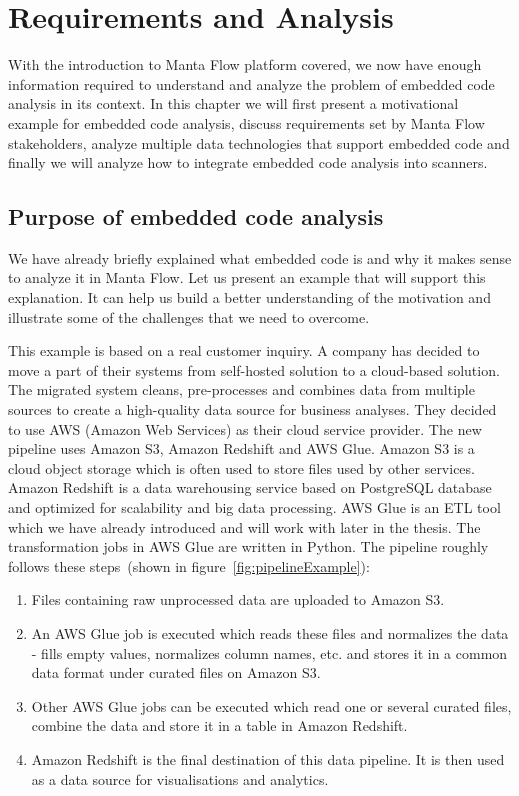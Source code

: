  \chapter{Requirements and Analysis}

With the introduction to Manta Flow platform covered, we now have enough information required to understand and analyze the problem of embedded code analysis in its context. In this chapter we will first present a motivational example for embedded code analysis, discuss requirements set by Manta Flow stakeholders, analyze multiple data technologies that support embedded code and finally we will analyze how to integrate embedded code analysis into scanners.

\section{Purpose of embedded code analysis}

We have already briefly explained what embedded code is and why it makes sense to analyze it in Manta Flow. Let us present an example that will support this explanation. It can help us build a better understanding of the motivation and illustrate some of the challenges that we need to overcome.
\par
This example is based on a real customer inquiry. A company has decided to move a part of their systems from self-hosted solution to a cloud-based solution. The migrated system cleans, pre-processes and combines data from multiple sources to create a high-quality data source for business analyses. They decided to use AWS (Amazon Web Services) as their cloud service provider. The new pipeline uses Amazon S3, Amazon Redshift and AWS Glue. Amazon S3 is a cloud object storage which is often used to store files used by other services. Amazon Redshift is a data warehousing service based on PostgreSQL database and optimized for scalability and big data processing. AWS Glue is an ETL tool which we have already introduced and will work with later in the thesis. The transformation jobs in AWS Glue are written in Python. The pipeline roughly follows these steps~(shown in figure~\ref{fig:pipelineExample}):
\begin{enumerate}
    \item Files containing raw unprocessed data are uploaded to Amazon S3.
    \item An AWS Glue job is executed which reads these files and normalizes the data - fills empty values, normalizes column names, etc. and stores it in a common data format under curated files on Amazon S3.
    \item Other AWS Glue jobs can be executed which read one or several curated files, combine the data and store it in a table in Amazon Redshift.
    \item Amazon Redshift is the final destination of this data pipeline. It is then used as a data source for visualisations and analytics.
\end{enumerate}

